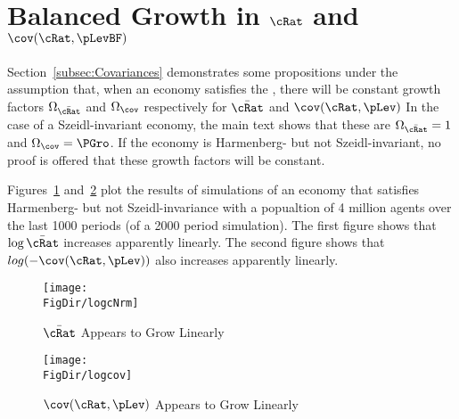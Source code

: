 \documentclass[\econtexRoot/BufferStockTheory]{subfiles}
\begin{document}
\hypertarget{ApndxBalancedGrowthCNrmAndCov}{}
\section{Balanced Growth in $\cRat$ and $\cov(\cRat,\pLevBF)$}\label{sec:ApndxBalancedGrowthCNrmAndCov}


\providecommand{\Grw}{\Omega}
\renewcommand{\Grw}{\Omega}

Section~\ref{subsec:Covariances} demonstrates some propositions under the assumption that, when an economy satisfies the {\GIC}, there will be constant growth factors $\Grw_{\bar{\cRat}}$ and $\Grw_{\cov}$ respectively for $\bar{\cRat}$ and $\cov(\cRat,\pLev)$  In the case of a Szeidl-invariant economy, the main text shows that these are $\Grw_{\bar{\cRat}}=1$ and $\Grw_{\cov}=\PGro$.  If the economy is Harmenberg- but not Szeidl-invariant, no proof is offered that these growth factors will be constant.

Figures~\ref{fig:logcNrm} and~\ref{fig:logcov} plot the results of simulations of an economy that satisfies Harmenberg- but not Szeidl-invariance with a popualtion of 4 million agents over the last 1000 periods (of a 2000 period simulation).  The first figure shows that $\log \bar{\cRat}$ increases apparently linearly.  The second figure shows that $log (-\cov(\cRat,\pLev))$ also increases apparently linearly.

\pagebreak
\begin{figure}[h]
  \centerline{
    \texttt{[image: \\FigDir/logcNrm]}
  }
  \caption{$\bar{\cRat}$ Appears to Grow Linearly}\label{fig:logcNrm}
\end{figure}
\begin{figure}[h]
  \centerline{
    \texttt{[image: \\FigDir/logcov]}
  }
  \caption{$\cov(\cRat,\pLev)$ Appears to Grow Linearly}\label{fig:logcov}
\end{figure}
\end{document}
